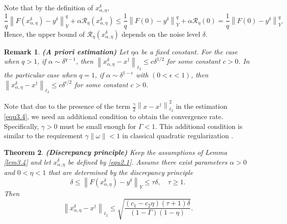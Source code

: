 \documentclass[a4paper,12pt]{article}
\newtheorem{theorem}{Theorem}[section]
\newtheorem{remark}[theorem]{Remark}
\numberwithin{equation}{section}
\begin{document}
\par Note that by the definition of $x_{\alpha,\eta}^{\delta}$,
\begin{equation*}
    \frac{1}{q}\left\|F\left(x_{\alpha,\eta}^{\delta}\right)-y^{\delta}\right\|_{Y}^{q}+ \alpha\mathcal{R}_{\eta}\left(x_{\alpha,\eta}^{\delta}\right)\leq \frac{1}{q}\left\|F\left(0\right)-y^{\delta}\right\|_{Y}^{q}+ \alpha\mathcal{R}_{\eta}\left(0\right) = \frac{1}{q}\left\|F\left(0\right)-y^{\delta}\right\|_{Y}^{q}.
\end{equation*}
Hence, the upper bound of $\mathcal{R}_{\eta}\left(x_{\alpha,\eta}^{\delta}\right)$ depends on the noise level $\delta$.

\begin{remark}\label{rem3.6}
    \textbf{(A priori estimation)} Let $\eta\alpha$ be a fixed constant. For the case when $q>1$, if $\alpha\sim\delta^{q-1}$, then $\left\|x_{\alpha,\eta}^{\delta}-x^{\dagger}\right\|_{\ell_{2}}\leq c\delta^{1/2}$ for some constant $c>0$. In the particular case when $q=1$, if $\alpha\sim\delta^{1-\epsilon}$ with $\left(0<\epsilon<1\right)$, then $\left\|x_{\alpha,\eta}^{\delta}-x^{\dagger}\right\|_{\ell_{2}}\leq c\delta^{\epsilon/2}$ for some constant $c>0$.
\end{remark}

\par Note that due to the presence of the term $\frac{\gamma}{2}\left\|x-x^{\dagger}\right\|_{\ell_{2}}^{2}$ in the estimation \eqref{equ3.4}, we need an additional condition to obtain the convergence rate. Specifically, $\gamma>0$ must be small enough for $\Gamma<1$. This additional condition is similar to the requirement $\gamma\left\|\omega\right\|<1$ in classical quadratic regularization \cite{EHN96}.

\begin{theorem}\label{the3.7}
    \textbf{(Discrepancy principle)} Keep the assumptions of Lemma \ref{lem3.4} and let $x_{\alpha,\eta}^{\delta}$ be defined by \eqref{equ2.1}. Assume there exist parameters $\alpha>0$ and $0<\eta<1$ that are determined by the discrepancy principle
    \begin{equation*}
        \delta\leq\left\|F\left(x_{\alpha,\eta}^{\delta}\right)-y^{\delta}\right\|_{Y} \leq \tau\delta,\quad \tau\geq 1.
    \end{equation*}
    Then
    \begin{equation*}
        \left\|x_{\alpha,\eta}^{\delta}-x^{\dagger}\right\|_{\ell_{2}}\leq \sqrt{\frac{\left(c_{1}-c_{2}\eta\right)\left(\tau+1\right)\delta} {\left(1-\Gamma\right)\left(1-\eta\right)}}.
    \end{equation*}
\end{theorem}
\end{document}
